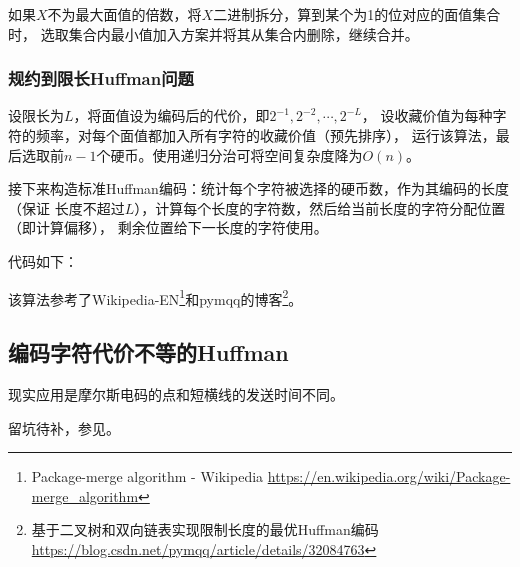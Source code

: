 如果$X$不为最大面值的倍数，将$X$二进制拆分，算到某个为1的位对应的面值集合时，
选取集合内最小值加入方案并将其从集合内删除，继续合并。
\subsubsection{规约到限长Huffman问题}
设限长为$L$，将面值设为编码后的代价，即$2^{-1},2^{-2},\cdots,2^{-L}$，
设收藏价值为每种字符的频率，对每个面值都加入所有字符的收藏价值（预先排序），
运行该算法，最后选取前$n-1$个硬币。使用递归分治可将空间复杂度降为$O(n)$。

接下来构造标准Huffman编码：统计每个字符被选择的硬币数，作为其编码的长度（保证
长度不超过$L$），计算每个长度的字符数，然后给当前长度的字符分配位置（即计算偏移），
剩余位置给下一长度的字符使用。

代码如下：


该算法参考了Wikipedia-EN\footnote{
	Package-merge algorithm - Wikipedia
	\url{https://en.wikipedia.org/wiki/Package-merge\_algorithm}
}和pymqq的博客\footnote{
	基于二叉树和双向链表实现限制长度的最优Huffman编码\\
	\url{https://blog.csdn.net/pymqq/article/details/32084763}
}。
\subsection{编码字符代价不等的Huffman}
现实应用是摩尔斯电码的点和短横线的发送时间不同。

留坑待补，参见\cite{huffman}。
